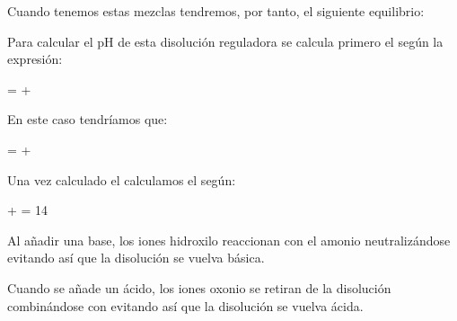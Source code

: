 \begin{enumerate}[label=\numberballmDarkTeal]
        Cuando tenemos estas mezclas tendremos, por tanto, el siguiente equilibrio:

        \begin{centeredequation}
        \end{centeredequation}

        Para calcular el pH de esta disolución reguladora se calcula primero el \pOH{} según la expresión:
        \begin{centeredequation}
            \pOH = \pKb + \log{}
        \end{centeredequation}

        En este caso tendríamos que:

        \begin{centeredequation}
            \pOH = \pKb + \log{}
        \end{centeredequation}

        Una vez calculado el \pOH{} calculamos el \pH{} según:

        \begin{centeredequation}
            \pH + \pOH = 14
        \end{centeredequation}

        Al añadir una base, los iones hidroxilo reaccionan con el amonio neutralizándose evitando así que la disolución se vuelva básica.
        \begin{centeredequation}
        \end{centeredequation}
        Cuando se añade un ácido, los iones oxonio se retiran de la disolución combinándose con  evitando así que la disolución se vuelva ácida.
        \begin{centeredequation}
        \end{centeredequation}
\end{enumerate}


